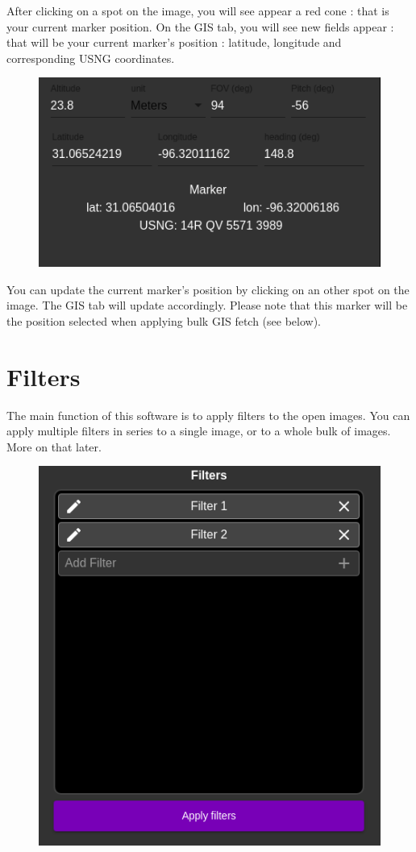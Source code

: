 \documentclass[12pt,a4paper]{article}
\begin{document}
After clicking on a spot on the image, you will see appear a red cone : that is your current marker position. On the GIS tab, you will see new fields appear : that will be your current marker's position : latitude, longitude and corresponding USNG coordinates.

\begin{figure}[H]
	\includegraphics[scale=0.6]{gis}
	\centering
\end{figure}

You can update the current marker's position by clicking on an other spot on the image. The GIS tab will update accordingly. Please note that this marker will be the position selected when applying bulk GIS fetch (see below).

\pagebreak

\part{Filters}
\setcounter{section}{0}

The main function of this software is to apply filters to the open images. You can apply multiple filters in series to a single image, or to a whole bulk of images. More on that later.

\begin{figure}[H]
	\includegraphics[scale=0.47]{filters_list}
	\centering
\end{figure}
\end{document}
